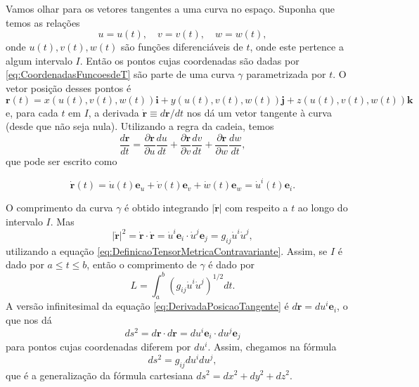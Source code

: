 Vamos olhar para os vetores tangentes a uma curva no espaço.
Suponha que temos as relações
\begin{equation}\label{eq:CoordenadasFuncoesdeT}
	u=u(t), \quad v=v(t), \quad w=w(t) ,
\end{equation}
onde $u(t),v(t),w(t)$ são funções diferenciáveis de $t$, onde este pertence a algum intervalo $I$. Então os pontos cujas coordenadas são dadas por \eqref{eq:CoordenadasFuncoesdeT} são parte de uma curva $\gamma$ parametrizada por $t$. O vetor posição desses pontos é 
\[
	\mathbf{r}(t)=x(u(t), v(t), w(t)) \mathbf{i}+y(u(t), v(t), w(t)) \mathbf{j}+z(u(t), v(t), w(t)) \mathbf{k}	
\]
e, para cada $t$ em $I$, a derivada $\dot{\mathbf{r}} \equiv d\mathbf{r}/dt$ nos dá um vetor tangente à curva (desde que não seja nula). Utilizando a regra da cadeia, temos
\[
	\frac{d \mathbf{r}}{d t}=\frac{\partial \mathbf{r}}{\partial u} \frac{d u}{d t}+\frac{\partial \mathbf{r}}{\partial v} \frac{d v}{d t}+\frac{\partial \mathbf{r}}{\partial w} \frac{d w}{d t} ,
\]
que pode ser escrito como

\begin{equation}\label{eq:DerivadaPosicaoTangente}
	\dot{\mathbf{r}}(t)=\dot{u}(t)\mathbf{e}_u+\dot{v}(t)\mathbf{e}_v+\dot{w}(t)\mathbf{e}_w = \dot{u}^i(t)\mathbf{e}_i.
\end{equation}

O comprimento da curva $\gamma$ é obtido integrando $|\dot{\mathbf{r}}|$ com respeito a $t$ ao longo do intervalo $I$. Mas
\[
	|\dot{\mathbf{r}}|^{2}=\dot{\mathbf{r}} \cdot \dot{\mathbf{r}}=\dot{u}^{i} \mathbf{e}_{i} \cdot \dot{u}^{j} \mathbf{e}_{j}=g_{i j} \dot{u}^{i} \dot{u}^{j},
\]
utilizando a equação \eqref{eq:DefinicaoTensorMetricaContravariante}. Assim, se $I$ é dado por $a\leq t\leq b$, então o comprimento de $\gamma$ é dado por
\begin{equation}\label{eq:ComprimentoCurva}
	\boxed{
	L=\int_{a}^{b}\left(g_{i j} \dot{u}^{i} \dot{u}^{j}\right)^{1 / 2} dt .
	}
\end{equation}
A versão infinitesimal da equação \eqref{eq:DerivadaPosicaoTangente} é $d\mathbf{r}=du^i\mathbf{e}_i$, o que nos dá
\[
	ds^2=d\mathbf{r}\cdot d\mathbf{r}=du^i\mathbf{e}_i \cdot du^j\mathbf{e}_j 
\]
para pontos cujas coordenadas diferem por $du^i$. Assim, chegamos na fórmula 
\begin{equation}
	\boxed{
		ds^2=g_{ij}du^i du^j,
	}
\end{equation}
que é a generalização da fórmula cartesiana $ds^2=dx^2+dy^2+dz^2$.

